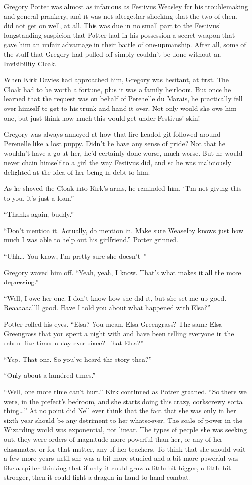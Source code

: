 Gregory Potter was almost as infamous as Festivus Weasley for his
troublemaking and general prankery, and it was not altogether shocking that the two of them did not get on well, at all. This was due in no small part to the Festivus’ longstanding suspicion that Potter had in his possession a secret weapon that gave him an unfair advantage in their battle of one-upmanship. After all, some of the stuff that Gregory had pulled off simply couldn’t be done without an Invisibility Cloak.

When Kirk Davies had approached him, Gregory was hesitant, at first. The Cloak had to be worth a fortune, plus it was a family heirloom. But once he learned that the request was on behalf of Perenelle du Marais, he practically fell over himself to get to his trunk and hand it over. Not only would she owe him one, but just think how much this would get under Festivus’ skin!

Gregory was always annoyed at how that fire-headed git followed around Perenelle like a lost puppy. Didn’t he have any sense of pride? Not that he wouldn’t have a go at her, he’d certainly done worse, much worse. But he would never chain himself to a girl the way Festivus did, and so he was maliciously delighted at the idea of her being in debt to him.

As he shoved the Cloak into Kirk’s arms, he reminded him. “I’m not giving this to you, it’s just a loan.”

“Thanks again, buddy.”

“Don’t mention it. Actually, do mention in. Make sure Weaselby knows just how much I was able to help out his girlfriend.” Potter grinned.

“Uhh… You know, I’m pretty sure she doesn’t–”

Gregory waved him off. “Yeah, yeah, I know. That’s what makes it all the more depressing.”

“Well, I owe her one. I don’t know how she did it, but she set me up good. Reaaaaaallll good. Have I told you about what happened with Elsa?”

Potter rolled his eyes. “Elsa? You mean, Elsa Greengrass? The same Elsa Greengrass that you spent a night with and have been telling everyone in the school five times a day ever since? That Elsa?”

“Yep. That one. So you’ve heard the story then?”

“Only about a hundred times.”

“Well, one more time can’t hurt.” Kirk continued as Potter groaned. “So there we were, in the prefect’s bedroom, and she starts doing this crazy, corkscrewy sorta thing…”
\simpleline
At no point did Nell ever think that the fact that she was only in her sixth year should be any detriment to her whatsoever. The scale of power in the Wizarding world was exponential, not linear. The types of people she was seeking out, they were orders of magnitude more powerful than her, or any of her classmates, or for that matter, any of her teachers. To think that she should wait a few more years until she was a bit more studied and a bit more powerful was like a spider thinking that if only it could grow a little bit bigger, a little bit stronger, then it could fight a dragon in hand-to-hand combat.

